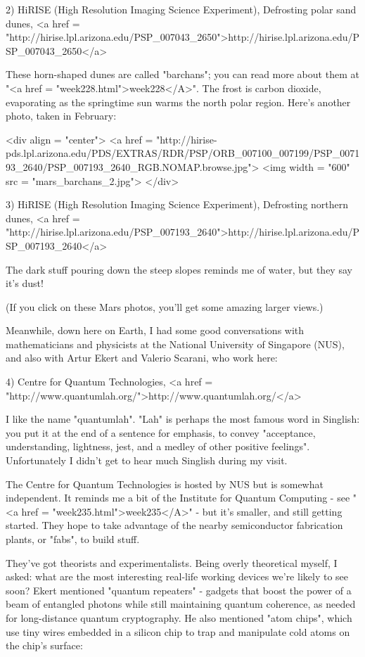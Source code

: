 2) HiRISE (High Resolution Imaging Science Experiment), 
Defrosting polar sand dunes, <a href = "http://hirise.lpl.arizona.edu/PSP_007043_2650">http://hirise.lpl.arizona.edu/PSP_007043_2650</a>

These horn-shaped dunes are called "barchans"; you can read
more about them at "<a href = "week228.html">week228</A>".
The frost is carbon dioxide, evaporating as the springtime sun warms
the north polar region.  Here's another photo, taken in February:

<div align = "center">
<a href = "http://hirise-pds.lpl.arizona.edu/PDS/EXTRAS/RDR/PSP/ORB_007100_007199/PSP_007193_2640/PSP_007193_2640_RGB.NOMAP.browse.jpg">
<img width = "600" src = "mars_barchans_2.jpg">
</div>

3) HiRISE (High Resolution Imaging Science Experiment), 
Defrosting northern dunes, <a href = "http://hirise.lpl.arizona.edu/PSP_007193_2640">http://hirise.lpl.arizona.edu/PSP_007193_2640</a>

The dark stuff pouring down the steep slopes reminds me of
water, but they say it's dust!

(If you click on these Mars photos, you'll get some amazing
larger views.)

Meanwhile, down here on Earth, I had some good conversations with 
mathematicians and physicists at the National University of Singapore 
(NUS), and also with Artur Ekert and Valerio Scarani, who work here:

4) Centre for Quantum Technologies, <a href = "http://www.quantumlah.org/">http://www.quantumlah.org/</a>

I like the name "quantumlah".  "Lah" is perhaps
the most famous word in Singlish: you put it at the end of a sentence
for emphasis, to convey "acceptance, understanding, lightness,
jest, and a medley of other positive feelings".  Unfortunately I
didn't get to hear much Singlish during my visit.

The Centre for Quantum Technologies is hosted by NUS but is somewhat
independent.  It reminds me a bit of the Institute for Quantum
Computing - see "<a href = "week235.html">week235</A>" - but
it's smaller, and still getting started.  They hope to take advantage
of the nearby semiconductor fabrication plants, or "fabs",
to build stuff.

They've got theorists and experimentalists.  Being overly theoretical
myself, I asked: what are the most interesting real-life working
devices we're likely to see soon?  Ekert mentioned "quantum
repeaters" - gadgets that boost the power of a beam of entangled
photons while still maintaining quantum coherence, as needed for
long-distance quantum cryptography.  He also mentioned "atom
chips", which use tiny wires embedded in a silicon chip to trap
and manipulate cold atoms on the chip's surface:

